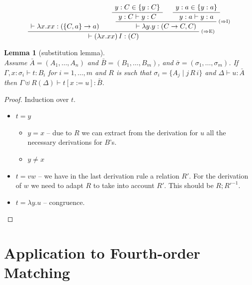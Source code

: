 \documentclass[10pt,a4paper]{article}
\theoremstyle{plain}%
\newtheorem{lemma}[theorem]{Lemma}
\begin{document}
\[
\AxiomC{$\vdash \lambda x.xx : (\{C, a\} \to a)$}
\AxiomC{$y:C\in\{y:C\}$}
\UnaryInfC{$y:C\vdash y : C$}
\AxiomC{$y:a\in\{y:a\}$}
\UnaryInfC{$y:a\vdash y : a$}
\RightLabel{\scriptsize ($\Rightarrow$I)}
\BinaryInfC{$ \vdash \lambda y.y : (C\to C,C)$}
\RightLabel{\scriptsize ($\Rightarrow$E)}
\BinaryInfC{$\vdash (\lambda x.xx)\,I:(C)$}
\DisplayProof
\]

\begin{lemma}[substitution lemma]
  ~\\
  Assume $\bar{A} = (A_1,\ldots,A_n)$ and $\bar{B} =
  (B_1,\ldots,B_m)$, and $\bar{\sigma} =
  (\sigma_1,\ldots,\sigma_m)$.
  If $\Gamma, x:\sigma_i\vdash t : B_i$ %
  for $i=1,\ldots,m$ and $R$ is such that $\sigma_i = \{A_j \mid j\, R\, i\}$
  and $\Delta\vdash u : \bar{A}$ %
  then $\Gamma\uplus R(\Delta) \vdash t[x:=u] : \bar{B}$.
  
\end{lemma}
\begin{proof}
  Induction over $t$.

  \begin{itemize}
  \item $t=y$
    \begin{itemize}
    \item $y=x$ -- due to $R$ we can extract from the derivation for
      $u$ all the necessary derivations for $B$'s.
    \item $y\not=x$
    \end{itemize}
  \item $t=vw$ -- we have in the last derivation rule a relation
    $R'$. For the derivation of $w$ we need to adapt $R$ to take into
    account $R'$. This should be $R;R'^{-1}$.
  \item $t=\lambda y.u$ -- congruence.
  \end{itemize}
\end{proof}


\newpage

\section{Application to Fourth-order Matching}
\end{document}
